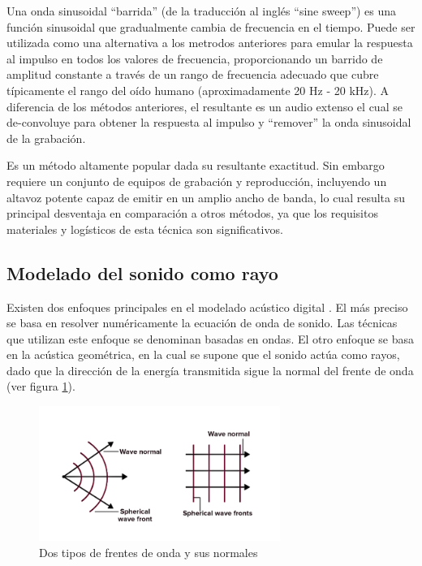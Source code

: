 \documentclass{prgrado}
\begin{document}
Una onda sinusoidal “barrida” (de la traducción al inglés “sine sweep”) es una función sinusoidal que gradualmente cambia de frecuencia en el tiempo. Puede ser utilizada como una alternativa a los metrodos anteriores para emular la respuesta al impulso en todos los valores de frecuencia, proporcionando un barrido de amplitud constante a través de un rango de frecuencia adecuado que cubre típicamente el rango del oído humano (aproximadamente 20 Hz - 20 kHz). A diferencia de los métodos anteriores, el resultante es un audio extenso el cual se de-convoluye para obtener la respuesta al impulso y “remover” la onda sinusoidal de la grabación.

Es un método altamente popular dada su resultante exactitud. Sin embargo requiere un conjunto de equipos de grabación y reproducción, incluyendo un altavoz potente capaz de emitir en un amplio ancho de banda, lo cual resulta su principal desventaja en comparación a otros métodos, ya que los requisitos materiales y logísticos de esta técnica son significativos.

\subsection{Modelado del sonido como rayo}

Existen dos enfoques principales en el modelado acústico digital \cite{AcousticModeling}. El más preciso se basa en resolver numéricamente la ecuación de onda de sonido. Las técnicas que utilizan este enfoque se denominan basadas en ondas. El otro enfoque se basa en la acústica geométrica, en la cual se supone que el sonido actúa como rayos, dado que la dirección de la energía transmitida sigue la normal del frente de onda (ver figura \ref{fig:wavefront}). 

\begin{figure}
    \centering
    \includegraphics[width=0.7\textwidth]{figs/wavefront.png}
    \captionsetup{justification=centering}
    \caption{Dos tipos de frentes de onda y sus normales}
    \label{fig:wavefront}
\end{figure}
\end{document}
